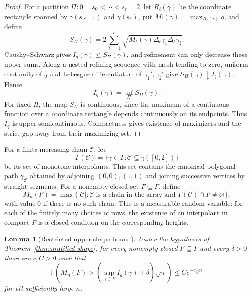 \documentclass[11pt]{article}
\newtheorem{lemma}[theorem]{Lemma}
\theoremstyle{remark}
\newcommand{\Pp}{\mathbb P}
\begin{document}
\begin{proof}
For a partition $\Pi:0=s_0<\cdots<s_r=2$, let $R_\ell(\gamma)$ be the
coordinate rectangle spanned by $\gamma(s_{\ell-1})$ and $\gamma(s_\ell)$,
put $M_\ell(\gamma)=\max_{R_\ell(\gamma)}q$, and define
\[
 S_\Pi(\gamma)=2\sum_{\ell=1}^r
 \sqrt{M_\ell(\gamma)
       \Delta_\ell\gamma_1\Delta_\ell\gamma_2}.
\]
Cauchy--Schwarz gives $I_q(\gamma)\le S_\Pi(\gamma)$, and refinement can
only decrease these upper sums.  Along a nested refining sequence with mesh
tending to zero, uniform continuity of $q$ and Lebesgue differentiation of
$\gamma_1',\gamma_2'$ give $S_\Pi(\gamma)\downarrow I_q(\gamma)$.  Hence
\[
 I_q(\gamma)=\inf_\Pi S_\Pi(\gamma).
\]
For fixed $\Pi$, the map $S_\Pi$ is continuous, since the maximum of a
continuous function over a coordinate rectangle depends continuously on its
endpoints.  Thus $I_q$ is upper semicontinuous.  Compactness gives existence
of maximizers and the strict gap away from their maximizing set.
\end{proof}

For a finite increasing chain $\mathcal C$, let
\[
 \Gamma(\mathcal C)
 =\{\gamma\in\Gamma:\mathcal C\subseteq\gamma([0,2])\}
\]
be its set of monotone interpolants.  This set contains the canonical
polygonal path $\gamma_{\mathcal C}$ obtained by adjoining $(0,0),(1,1)$
and joining successive vertices by straight segments.  For a nonempty
closed set $F\subseteq\Gamma$, define
\[
 M_n(F)=\max\{|\mathcal C|:
       \mathcal C\text{ is a chain in the array and }
       \Gamma(\mathcal C)\cap F\ne\varnothing\},
\]
with value $0$ if there is no such chain.  This is a measurable random
variable: for each of the finitely many choices of rows, the existence of an
interpolant in compact $F$ is a closed condition on the corresponding
heights.

\begin{lemma}[Restricted upper shape bound]\label{lem:restricted-upper}
Under the hypotheses of Theorem~\ref{thm:stratified-shape}, for every
nonempty closed $F\subseteq\Gamma$ and every $\delta>0$ there are $c,C>0$
such that
\begin{equation}\label{eq:restricted-upper}
 \Pp\left(
 M_n(F)>\left(\sup_{\gamma\in F}I_q(\gamma)+\delta\right)\sqrt n
 \right)
 \le Ce^{-c\sqrt n}
\end{equation}
for all sufficiently large $n$.
\end{lemma}
\end{document}
